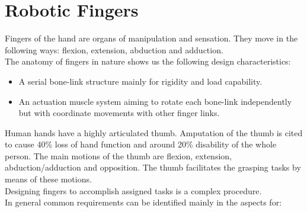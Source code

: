 \documentclass[a4paper, 10pt, conference]{ieeeconf}      %
\begin{document}
\section{\textbf{Robotic Fingers}}
Fingers of the hand are organs of manipulation and sensation. They move in the following ways: flexion, extension, abduction and adduction.\\
The anatomy of fingers in nature shows us the following design characteristics:\\
\begin{itemize}
	\item A serial bone-link structure mainly for rigidity and load capability.
	\item An actuation muscle system aiming to rotate each bone-link independently but with coordinate movements with other finger links.\\
\end{itemize}
Human hands have a highly articulated thumb. Amputation of the thumb is cited to cause 40\% loss of hand function and around 20\% disability of the whole person. The main motions of the thumb are flexion, extension, abduction/adduction and opposition. The thumb facilitates the grasping tasks by means of these motions.\\
Designing fingers to accomplish assigned tasks is a complex procedure.\\
In general common requirements can be identified mainly in the aspects for:\\
\end{document}
